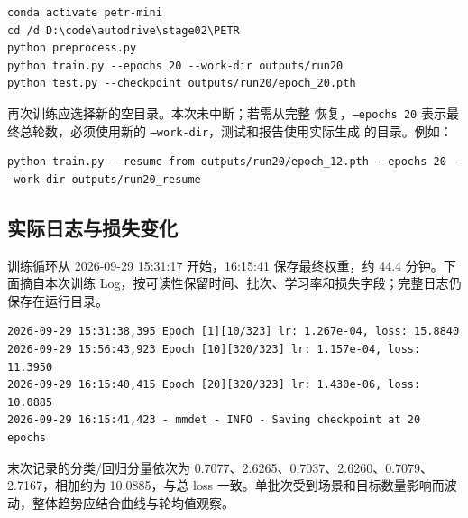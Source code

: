 \documentclass[UTF8,zihao=-4,fontset=windows]{ctexart}
\begin{document}
\par\noindent\begin{minipage}{\linewidth}
\begin{lstlisting}[language={},caption={本次实际运行命令}]
conda activate petr-mini
cd /d D:\code\autodrive\stage02\PETR
python preprocess.py
python train.py --epochs 20 --work-dir outputs/run20
python test.py --checkpoint outputs/run20/epoch_20.pth
\end{lstlisting}
\end{minipage}\par

再次训练应选择新的空目录。本次未中断；若需从完整  恢复，\texttt{--epochs 20} 表示最终总轮数，必须使用新的 \texttt{--work-dir}，测试和报告使用实际生成  的目录。例如：
\par\noindent\begin{minipage}{\linewidth}
\begin{lstlisting}[language={},caption={断点恢复示例，本次未执行}]
python train.py --resume-from outputs/run20/epoch_12.pth --epochs 20 --work-dir outputs/run20_resume
\end{lstlisting}
\end{minipage}\par

\subsection{实际日志与损失变化}

训练循环从 2026-09-29 15:31:17 开始，16:15:41 保存最终权重，约 44.4 分钟。下面摘自本次训练 Log，按可读性保留时间、批次、学习率和损失字段；完整日志仍保存在运行目录。

\par\noindent\begin{minipage}{\linewidth}
\begin{lstlisting}[language={},caption={第 1、10、20 轮及最终保存的实际 Log 摘录}]
2026-09-29 15:31:38,395 Epoch [1][10/323] lr: 1.267e-04, loss: 15.8840
2026-09-29 15:56:43,923 Epoch [10][320/323] lr: 1.157e-04, loss: 11.3950
2026-09-29 16:15:40,415 Epoch [20][320/323] lr: 1.430e-06, loss: 10.0885
2026-09-29 16:15:41,423 - mmdet - INFO - Saving checkpoint at 20 epochs
\end{lstlisting}
\end{minipage}\par

末次记录的分类/回归分量依次为 0.7077、2.6265、0.7037、2.6260、0.7079、2.7167，相加约为 10.0885，与总 loss 一致。单批次受到场景和目标数量影响而波动，整体趋势应结合曲线与轮均值观察。
\end{document}

